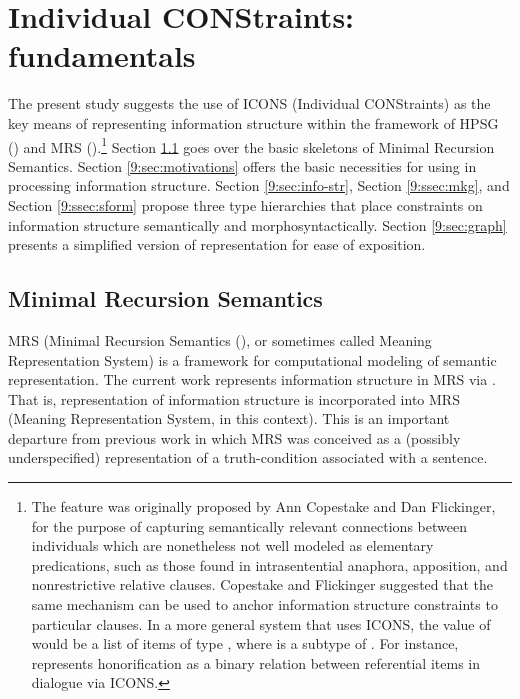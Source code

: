\chapter{Individual CONStraints: fundamentals}
\label{chapter9}
\setcounter{enums}{0}


\noindent The present study suggests the use of ICONS (Individual
CONStraints) as the key means of representing information structure
within the framework of HPSG (\citealt{pollard:sag:94}) and
MRS
(\citealt{copestake:etal:05}).\footnote{The feature  was
  originally proposed by Ann Copestake and Dan
  Flickinger, for the purpose
  of capturing semantically relevant connections between individuals
  which are nonetheless not well modeled as elementary predications,
  such as those found in intrasentential anaphora, apposition, and
  nonrestrictive relative clauses. Copestake and
  Flickinger suggested that the same mechanism can be used to anchor
  information structure constraints to particular clauses.  In a more
  general system that uses ICONS, the value of  would be a
  list of items of type , where  is a subtype
  of . For instance, \citet{song:16}
  represents honorification as a binary relation between referential
  items in dialogue via ICONS.} Section \ref{2:sec:mrs} goes over the basic
skeletons of Minimal Recursion Semantics.  Section \ref{9:sec:motivations}
offers the basic necessities for using  in processing
information structure. Section \ref{9:sec:info-str}, Section \ref{9:ssec:mkg}, and
Section \ref{9:ssec:sform} propose three type hierarchies that place
constraints on information structure semantically and
morphosyntactically.  Section \ref{9:sec:graph} presents a simplified version
of representation for ease of exposition.




\section{Minimal Recursion Semantics}
\label{2:sec:mrs}


MRS (Minimal Recursion Semantics
(\citealt{copestake:etal:05}), or sometimes called Meaning
Representation System) is a framework for computational modeling of
semantic representation.  The current work represents information
structure in MRS via . That is,
representation of information structure is incorporated into MRS
(Meaning Representation System, in this context).  This is an
important departure from previous work in which MRS was conceived as a
(possibly underspecified) representation of a truth-condition
associated with a sentence.



